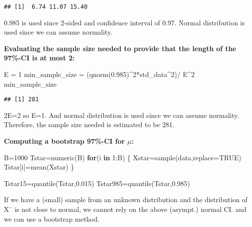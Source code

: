 \documentclass[
]{article}
\newenvironment{Shaded}{\begin{snugshade}}{\end{snugshade}}
\newcommand{\AttributeTok}[1]{\textcolor[rgb]{0.77,0.63,0.00}{#1}}
\newcommand{\ConstantTok}[1]{\textcolor[rgb]{0.00,0.00,0.00}{#1}}
\newcommand{\ControlFlowTok}[1]{\textcolor[rgb]{0.13,0.29,0.53}{\textbf{#1}}}
\newcommand{\DecValTok}[1]{\textcolor[rgb]{0.00,0.00,0.81}{#1}}
\newcommand{\FloatTok}[1]{\textcolor[rgb]{0.00,0.00,0.81}{#1}}
\newcommand{\FunctionTok}[1]{\textcolor[rgb]{0.00,0.00,0.00}{#1}}
\newcommand{\NormalTok}[1]{#1}
\newcommand{\OtherTok}[1]{\textcolor[rgb]{0.56,0.35,0.01}{#1}}
\newcommand{\SpecialCharTok}[1]{\textcolor[rgb]{0.00,0.00,0.00}{#1}}
\begin{document}
\begin{verbatim}
## [1]  6.74 11.07 15.40
\end{verbatim}

0.985 is used since 2-sided and confidence interval of 0.97. Normal
distribution is used since we can assume normality.

\textbf{Evaluating the sample size needed to provide that the length of
the 97\%-CI is at most 2:}

\begin{Shaded}
\begin{Highlighting}[]
\NormalTok{E }\OtherTok{=} \DecValTok{1}
\NormalTok{min\_sample\_size }\OtherTok{=}\NormalTok{ (}\FunctionTok{qnorm}\NormalTok{(}\FloatTok{0.985}\NormalTok{)}\SpecialCharTok{\^{}}\DecValTok{2}\SpecialCharTok{*}\NormalTok{std\_data}\SpecialCharTok{\^{}}\DecValTok{2}\NormalTok{)}\SpecialCharTok{/}\NormalTok{ E}\SpecialCharTok{\^{}}\DecValTok{2}
\NormalTok{min\_sample\_size}
\end{Highlighting}
\end{Shaded}

\begin{verbatim}
## [1] 281
\end{verbatim}

2E=2 so E=1. And normal distribution is used since we can assume
normality. Therefore, the sample size needed is estimated to be 281.

\textbf{Computing a bootstrap 97\%-CI for \(\mu\):}

\begin{Shaded}
\begin{Highlighting}[]
\NormalTok{B}\OtherTok{=}\DecValTok{1000}
\NormalTok{Tstar}\OtherTok{=}\FunctionTok{numeric}\NormalTok{(B)}
\ControlFlowTok{for}\NormalTok{(i }\ControlFlowTok{in} \DecValTok{1}\SpecialCharTok{:}\NormalTok{B) \{}
\NormalTok{  Xstar}\OtherTok{=}\FunctionTok{sample}\NormalTok{(data,}\AttributeTok{replace=}\ConstantTok{TRUE}\NormalTok{)}
\NormalTok{  Tstar[i]}\OtherTok{=}\FunctionTok{mean}\NormalTok{(Xstar) \}}

\NormalTok{Tstar15}\OtherTok{=}\FunctionTok{quantile}\NormalTok{(Tstar,}\FloatTok{0.015}\NormalTok{)}
\NormalTok{Tstar985}\OtherTok{=}\FunctionTok{quantile}\NormalTok{(Tstar,}\FloatTok{0.985}\NormalTok{)}
\end{Highlighting}
\end{Shaded}

If we have a (small) sample from an unknown distribution and the
distribution of X¯ is not close to normal, we cannot rely on the above
(asympt.) normal CI. and we can use a bootstrap method.
\end{document}
